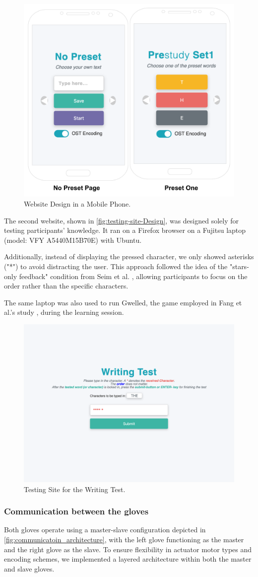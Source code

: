 \begin{figure}
    \centering
    \includegraphics[width=0.5\linewidth]{src/pictures/MobileWebsiteVersion.drawio.pdf}
    \caption{Website Design in a Mobile Phone.}
    \label{fig:Website-Design}
\end{figure}

The second website, shown in \autoref{fig:testing-site-Design}, was designed solely for testing participants' knowledge. It ran on a Firefox browser on a Fujitsu laptop (model: VFY A5440M15B70E) with Ubuntu.

Additionally, instead of displaying the pressed character, we only showed asterisks ("*") to avoid distracting the user. This approach followed the idea of the "stars-only feedback" condition from Seim et al. \cite{Seim2014}, allowing participants to focus on the order rather than the specific characters.

The same laptop was also used to run Gwelled, the game employed in Fang et al.'s study \cite{Fang2023}, during the learning session.

\begin{figure}
    \centering
    \includegraphics[width=0.5\linewidth]{src/pictures/testingSite.png}
    \caption{Testing Site for the Writing Test.}
    \label{fig:testing-site-Design}
\end{figure}


\subsubsection{Communication between the gloves}
Both gloves operate using a master-slave configuration depicted in \autoref{fig:communicatoin_architecture}, with the left glove functioning as the master and the right glove as the slave. To ensure flexibility in actuator motor types and encoding schemes, we implemented a layered architecture within both the master and slave gloves.

